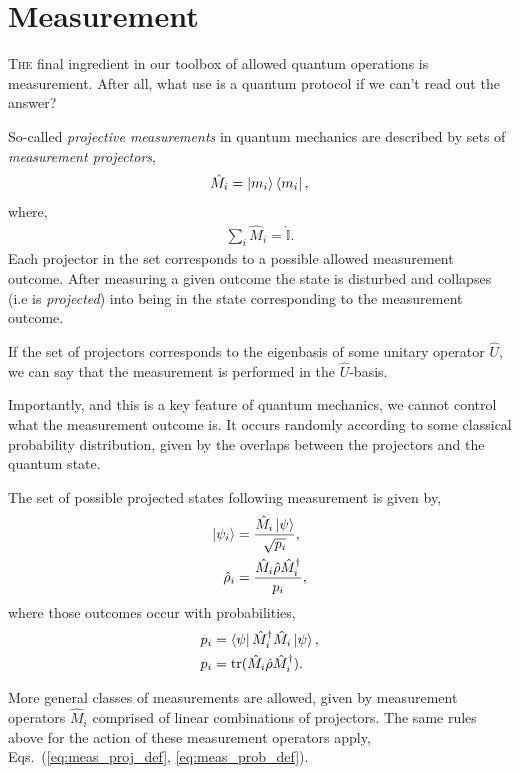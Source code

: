\documentclass[aps,pra,twocolumn,amsmath,amssymb,nofootinbib,superscriptaddress]{revtex4}
\newcommand{\dropcap}[2]{\lettrine[lines=2, findent=3pt, nindent=0pt]{#1}{#2}}
\begin{document}
%
%

\section{Measurement}

\dropcap{T}{he} final ingredient in our toolbox of allowed quantum operations is measurement. After all, what use is a quantum protocol if we can't read out the answer?

So-called \textit{projective measurements} in quantum mechanics are described by sets of \textit{measurement projectors},
\begin{align}
\hat{M}_i = \ket{m_i}\bra{m_i},	
\end{align}
where,
\begin{align}
\sum_i \hat{M}_i = \hat{\mathbb{I}}.	
\end{align}
Each projector in the set corresponds to a possible allowed measurement outcome. After measuring a given outcome the state is disturbed and collapses (i.e is \textit{projected}) into being in the state corresponding to the measurement outcome.

If the set of projectors corresponds to the eigenbasis of some unitary operator $\hat{U}$, we can say that the measurement is performed in the $\hat{U}$-basis.

Importantly, and this is a key feature of quantum mechanics, we cannot control what the measurement outcome is. It occurs randomly according to some classical probability distribution, given by the overlaps between the projectors and the quantum state.

The set of possible projected states following measurement is given by,
\begin{align}\label{eq:meas_proj_def}
\ket{\psi_i} &= \frac{\hat{M}_i \ket\psi}{\sqrt{p_i}},\nonumber\\
\hat\rho_i &= \frac{\hat{M}_i\hat\rho\hat{M}_i^\dag}{p_i},
\end{align}
where those outcomes occur with probabilities,
\begin{align}\label{eq:meas_prob_def}
p_i &= \bra\psi \hat{M}_i^\dag \hat{M}_i\ket\psi,\nonumber\\
p_i &= \mathrm{tr}(\hat{M}_i\hat\rho\hat{M}_i^\dag).
\end{align}

More general classes of measurements are allowed, given by measurement operators $\hat{M}_i$ comprised of linear combinations of projectors. The same rules above for the action of these measurement operators apply, Eqs.~(\ref{eq:meas_proj_def}, \ref{eq:meas_prob_def}).
\end{document}
